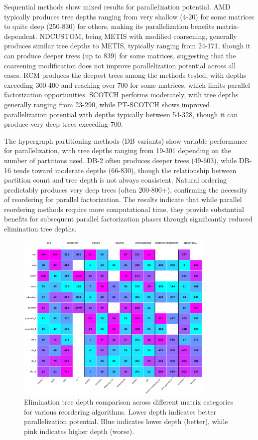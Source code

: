 Sequential methods show mixed results for parallelization potential. AMD typically produces tree depths ranging from very shallow (4-20) for some matrices to quite deep (250-830) for others, making its parallelization benefits matrix-dependent. NDCUSTOM, being METIS with modified coarsening, generally produces similar tree depths to METIS, typically ranging from 24-171, though it can produce deeper trees (up to 839) for some matrices, suggesting that the coarsening modification does not improve parallelization potential across all cases. RCM produces the deepest trees among the methods tested, with depths exceeding 300-400 and reaching over 700 for some matrices, which limits parallel factorization opportunities. SCOTCH performs moderately, with tree depths generally ranging from 23-290, while PT-SCOTCH shows improved parallelization potential with depths typically between 54-328, though it can produce very deep trees exceeding 700.

The hypergraph partitioning methods (DB variants) show variable performance for parallelization, with tree depths ranging from 19-301 depending on the number of partitions used. DB-2 often produces deeper trees (49-603), while DB-16 tends toward moderate depths (66-830), though the relationship between partition count and tree depth is not always consistent. Natural ordering predictably produces very deep trees (often 200-800+), confirming the necessity of reordering for parallel factorization. The results indicate that while parallel reordering methods require more computational time, they provide substantial benefits for subsequent parallel factorization phases through significantly reduced elimination tree depths.


\begin{figure}[h]
\centering
\includegraphics[width=0.85\textwidth]{fig/res/elimination_tree_depth_all_categories.png}
\caption{Elimination tree depth comparison across different matrix categories for various reordering algorithms. Lower depth indicates better parallelization potential. Blue indicates lower depth (better), while pink indicates higher depth (worse).}
\label{fig:elimination-tree-depth}
\end{figure}


